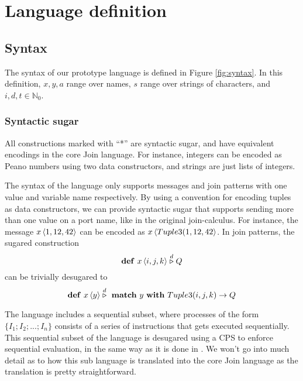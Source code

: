 \section{Language definition}

\subsection{Syntax}

The syntax of our prototype language is defined in Figure \ref{fig:syntax}. In
this definition, $x,y,a$ range over names, $s$ range over strings of characters,
and $i,d,t \in \mathbb{N}_0$.

\subsubsection{Syntactic sugar}
All constructions marked with ``*'' are syntactic sugar, and have equivalent
encodings in the core Join language. For instance, integers can be encoded as
Peano numbers using two data constructors, and strings are just lists of
integers.

The syntax of the language only supports messages and join patterns with one
value and variable name respectively. By using a convention for encoding tuples
as data constructors, we can provide syntactic sugar that supports sending more
than one value on a port name, like in the original join-calculus. For instance,
the message $\atm x<1, 12, 42>$ can be encoded as $\atm x<Tuple3(1, 12, 42>$. In
join patterns, the sugared construction
\begin{equation*}
 \mathbf{def}~\atm x<i,j,k> \stackrel{d}{\triangleright} Q
\end{equation*}
can be trivially desugared to
\begin{equation*}
 \mathbf{def}~\atm x<y> \stackrel{d}{\triangleright} ~\mathbf{match}~ y
 ~\mathbf{with}~ Tuple3(i,j,k) \rightarrow Q
\end{equation*}

The language includes a sequential subset, where processes of the form $\{ I_1;
I_2;...;I_n\}$ consists of a series of instructions that gets executed
sequentially. This sequential subset of the language is desugared using a CPS to
enforce sequential evaluation, in the same way as it is done in
\cite{fournet1996reflexive}. We won't go into much detail as to how this sub
language is translated into the core Join language as the translation is pretty
straightforward.

